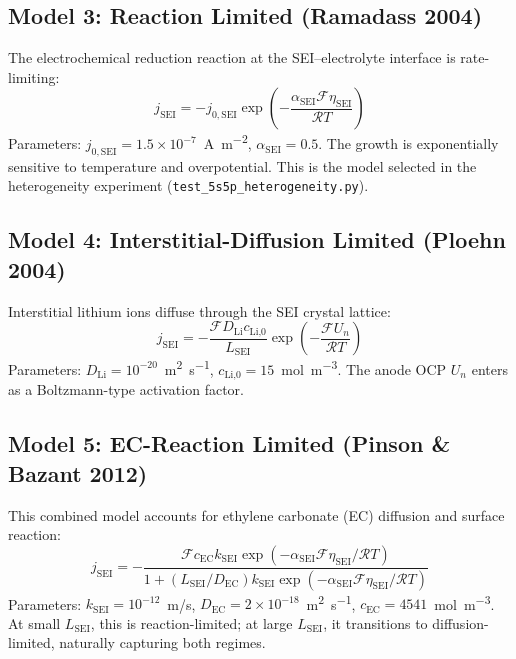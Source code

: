 \subsection{Model 3: Reaction Limited (Ramadass 2004)~\cite{Ramadass2004}}

The electrochemical reduction reaction at the SEI--electrolyte interface is rate-limiting:
\begin{equation}
  j_\text{SEI} = -j_{0,\text{SEI}} \exp\!\left(-\frac{\alpha_\text{SEI} \mathcal{F} \eta_\text{SEI}}{\mathcal{R} T}\right)
  \label{eq:sei_reaction}
\end{equation}
Parameters: $j_{0,\text{SEI}} = 1.5\times10^{-7}$~\si{\ampere\per\meter\squared}, $\alpha_\text{SEI} = 0.5$. The growth is exponentially sensitive to temperature and overpotential. This is the model selected in the heterogeneity experiment (\texttt{test\_5s5p\_heterogeneity.py}).

\subsection{Model 4: Interstitial-Diffusion Limited (Ploehn 2004)~\cite{Ploehn2004}}

Interstitial lithium ions diffuse through the SEI crystal lattice:
\begin{equation}
  j_\text{SEI} = -\frac{\mathcal{F} D_\text{Li} c_\text{Li,0}}{L_\text{SEI}} \exp\!\left(-\frac{\mathcal{F} U_n}{\mathcal{R} T}\right)
  \label{eq:sei_interstitial}
\end{equation}
Parameters: $D_\text{Li} = 10^{-20}$~\si{\meter\squared\per\second}, $c_\text{Li,0} = 15$~\si{\mol\per\meter\cubed}. The anode OCP $U_n$ enters as a Boltzmann-type activation factor.

\subsection{Model 5: EC-Reaction Limited (Pinson \& Bazant 2012)~\cite{Pinson2012}}

This combined model accounts for ethylene carbonate (EC) diffusion and surface reaction:
\begin{equation}
  j_\text{SEI} = -\frac{\mathcal{F} c_\text{EC} k_\text{SEI} \exp(-\alpha_\text{SEI} \mathcal{F}\eta_\text{SEI}/\mathcal{R}T)}{1 + (L_\text{SEI}/D_\text{EC}) k_\text{SEI} \exp(-\alpha_\text{SEI} \mathcal{F}\eta_\text{SEI}/\mathcal{R}T)}
  \label{eq:sei_ec}
\end{equation}
Parameters: $k_\text{SEI} = 10^{-12}$~m/s, $D_\text{EC} = 2\times10^{-18}$~\si{\meter\squared\per\second}, $c_\text{EC} = 4541$~\si{\mol\per\meter\cubed}. At small $L_\text{SEI}$, this is reaction-limited; at large $L_\text{SEI}$, it transitions to diffusion-limited, naturally capturing both regimes.

